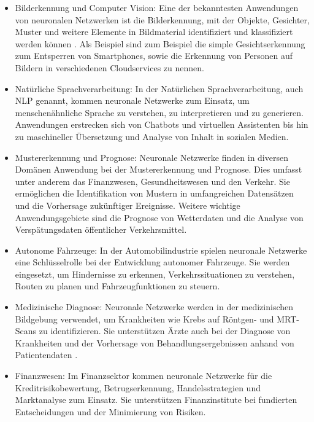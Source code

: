\begin{itemize} 

\item Bilderkennung und Computer Vision: Eine der bekanntesten Anwendungen von neuronalen Netzwerken ist die Bilderkennung, mit der Objekte, Gesichter, Muster und weitere Elemente in Bildmaterial identifiziert und klassifiziert werden können \citep{LeCun_Deep_Learning}. Als Beispiel sind zum Beispiel die simple Gesichtserkennung zum Entsperren von Smartphones, sowie die Erkennung von Personen auf Bildern in verschiedenen Cloudservices zu nennen.

\item Natürliche Sprachverarbeitung: In der Natürlichen Sprachverarbeitung, auch NLP genannt, kommen neuronale Netzwerke zum Einsatz, um menschenähnliche Sprache zu verstehen, zu interpretieren und zu generieren. Anwendungen erstrecken sich von Chatbots und virtuellen Assistenten bis hin zu maschineller Übersetzung und Analyse von Inhalt in sozialen Medien.

\item Mustererkennung und Prognose: Neuronale Netzwerke finden in diversen Domänen Anwendung bei der Mustererkennung und Prognose. Dies umfasst unter anderem das Finanzwesen, Gesundheitswesen und den Verkehr. Sie ermöglichen die Identifikation von Mustern in umfangreichen Datensätzen und die Vorhersage zukünftiger Ereignisse. Weitere wichtige Anwendungsgebiete sind die Prognose von Wetterdaten und die Analyse von Verspätungsdaten öffentlicher Verkehrsmittel.

\item Autonome Fahrzeuge: In der Automobilindustrie spielen neuronale Netzwerke eine Schlüsselrolle bei der Entwicklung autonomer Fahrzeuge. Sie werden eingesetzt, um Hindernisse zu erkennen, Verkehrssituationen zu verstehen, Routen zu planen und Fahrzeugfunktionen zu steuern.

\item Medizinische Diagnose: Neuronale Netzwerke werden in der medizinischen Bildgebung verwendet, um Krankheiten wie Krebs auf Röntgen- und MRT-Scans zu identifizieren. Sie unterstützen Ärzte auch bei der Diagnose von Krankheiten und der Vorhersage von Behandlungsergebnissen anhand von Patientendaten \citep{LeCun_Deep_Learning}.

\item Finanzwesen: Im Finanzsektor kommen neuronale Netzwerke für die Kreditrisikobewertung, Betrugserkennung, Handelsstrategien und Marktanalyse zum Einsatz. Sie unterstützen Finanzinstitute bei fundierten Entscheidungen und der Minimierung von Risiken.

\end{itemize}

